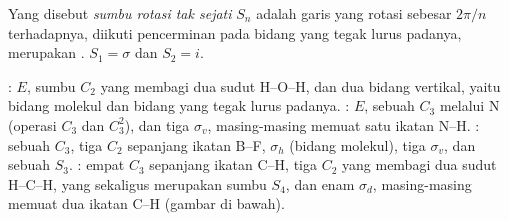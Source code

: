 \begin{definition}\label{def:b3:point-groups:improper}
Yang disebut \emph{sumbu rotasi tak sejati}
$S_n$ adalah garis yang rotasi sebesar $2\pi/n$ terhadapnya, diikuti
pencerminan pada bidang yang tegak lurus padanya, merupakan .
$S_1 = \sigma$ dan $S_2 = i$.
\end{definition}

\begin{example}\label{ex:b3:point-groups:elements}
: $E$, sumbu $C_2$ yang membagi dua sudut H--O--H, dan dua bidang
vertikal, yaitu bidang molekul dan bidang yang tegak lurus padanya. :
$E$, sebuah $C_3$ melalui N (operasi $C_3$ dan $C_3^2$), dan tiga $\sigma_v$,
masing-masing memuat satu ikatan N--H. : sebuah $C_3$, tiga $C_2$
sepanjang ikatan B--F, $\sigma_h$ (bidang molekul), tiga $\sigma_v$, dan sebuah
$S_3$. : empat $C_3$ sepanjang ikatan C--H, tiga $C_2$ yang membagi dua
sudut H--C--H, yang sekaligus merupakan sumbu $S_4$, dan enam $\sigma_d$,
masing-masing memuat dua ikatan C--H (gambar di bawah).
\end{example}

